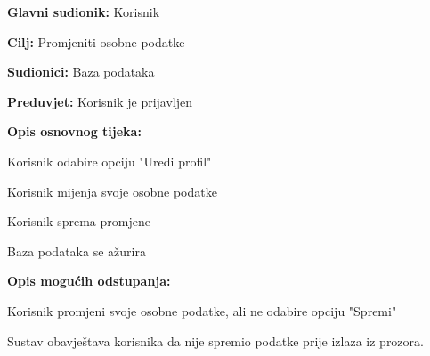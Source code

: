 					\noindent {}
					\begin{packed_item}
	
						\item \textbf{Glavni sudionik: } Korisnik
						\item  \textbf{Cilj:} Promjeniti osobne podatke
						\item  \textbf{Sudionici:} Baza podataka
						\item  \textbf{Preduvjet:} Korisnik je prijavljen
						\item  \textbf{Opis osnovnog tijeka:}
						
						\item[] \begin{packed_enum}
	
							\item Korisnik odabire opciju "Uredi profil"
							\item Korisnik mijenja svoje osobne podatke
							\item Korisnik sprema promjene
							\item Baza podataka se ažurira
						\end{packed_enum}
						\item  \textbf{Opis mogućih odstupanja:}
						
						\item[] \begin{packed_item}
	
							\item[2.a] Korisnik promjeni svoje osobne podatke, ali ne odabire opciju "Spremi" 
							\item[] \begin{packed_enum}
								
								\item Sustav obavještava korisnika da nije spremio podatke prije izlaza iz prozora.
								
								
							\end{packed_enum}
							
						\end{packed_item}
						
						
					\end{packed_item}

